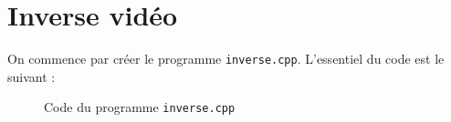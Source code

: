 \documentclass[french,a4paper,10pt]{article}
\begin{document}
    \newpage
    \section{Inverse vidéo}\label{sec:2}

    On commence par créer le programme \texttt{inverse.cpp}.
    L'essentiel du code est le suivant :
    \begin{figure}[!htb]
        \centering
        \caption{Code du programme \texttt{inverse.cpp}}\label{Fig:code-inverse}
    \end{figure}
\end{document}
